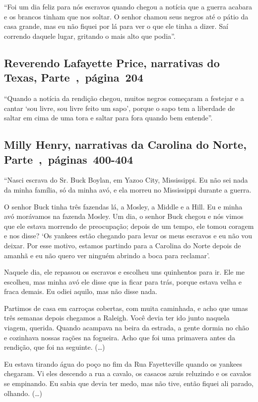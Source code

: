 ``Foi um dia feliz para nós escravos quando chegou a notícia que a
guerra acabara e os brancos tinham que nos soltar. O senhor chamou seus
negros até o pátio da casa grande, mas eu não fiquei por lá para ver o
que ele tinha a dizer. Saí correndo daquele lugar, gritando o mais alto
que podia''.

\subsection{Reverendo Lafayette Price, narrativas do Texas, Parte~,~página~204}
\label{ref215}

``Quando a notícia da rendição chegou, muitos negros começaram a
festejar e a cantar `sou livre, sou livre feito um sapo', porque o sapo
tem a liberdade de saltar em cima de uma tora e saltar para fora quando
bem entende''.

\subsection{Milly Henry, narrativas da Carolina do Norte, Parte~,~páginas~400-404}
\label{ref141}

``Nasci escrava do Sr. Buck Boylan, em Yazoo City, Mississippi. Eu não
sei nada da minha família, só da minha avó, e ela morreu no Mississippi
durante a guerra.

O senhor Buck tinha três fazendas lá, a Mosley, a Middle e a Hill. Eu e
minha avó morávamos na fazenda Mosley. Um dia, o senhor Buck chegou e
nós vimos que ele estava morrendo de preocupação; depois de um tempo,
ele tomou coragem e nos disse? `Os yankees estão chegando para levar os
meus escravos e eu não vou deixar. Por esse motivo, estamos partindo
para a Carolina do Norte depois de amanhã e eu não quero ver ninguém
abrindo a boca para reclamar'.

Naquele dia, ele repassou os escravos e escolheu uns quinhentos para ir.
Ele me escolheu, mas minha avó ele disse que ia ficar para trás, porque
estava velha e fraca demais. Eu odiei aquilo, mas não disse nada.

Partimos de casa em carroças cobertas, com muita caminhada, e acho que
umas três semanas depois chegamos a Raleigh. Você devia ter ido junto
naquela viagem, querida. Quando acampava na beira da estrada, a gente
dormia no chão e cozinhava nossas rações na fogueira. Acho que foi uma
primavera antes da rendição, que foi na seguinte. (\ldots{})

Eu estava tirando água do poço no fim da Rua Fayetteville quando os
yankees chegaram. Vi eles descendo a rua a cavalo, os casacos azuis
reluzindo e os cavalos se empinando. Eu sabia que devia ter medo, mas
não tive, então fiquei ali parado, olhando. (\ldots{})


